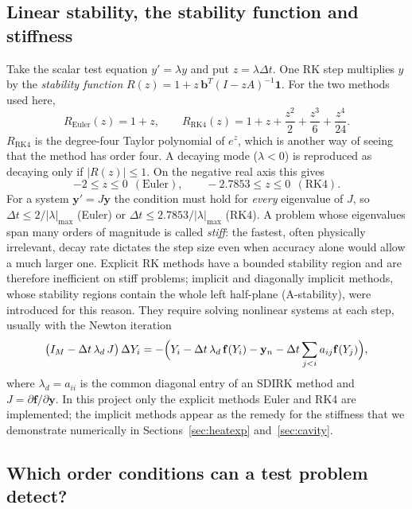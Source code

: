 \documentclass[11pt,a4paper]{article}
\newcommand{\Dt}{\Delta t}
\newcommand{\bfy}{\mathbf{y}}
\newcommand{\bff}{\mathbf{f}}
\begin{document}
\subsection{Linear stability, the stability function and stiffness}\label{sec:stab}

Take the scalar test equation $y'=\lambda y$ and put $z=\lambda\Dt$. One RK step multiplies $y$ by the
\emph{stability function} $R(z)=1+z\,\mathbf b^{T}(I-zA)^{-1}\mathbf 1$. For the two methods used here,
\begin{equation}
R_{\mathrm{Euler}}(z)=1+z,\qquad
R_{\mathrm{RK4}}(z)=1+z+\frac{z^2}{2}+\frac{z^3}{6}+\frac{z^4}{24}.
\end{equation}
$R_{\mathrm{RK4}}$ is the degree-four Taylor polynomial of $e^z$, which is another way of seeing that the
method has order four. A decaying mode ($\lambda<0$) is reproduced as decaying only if $|R(z)|\le1$.
On the negative real axis this gives
\begin{equation}
-2\le z\le0\ \ (\text{Euler}),\qquad -2.7853\le z\le0\ \ (\text{RK4}).
\label{eq:stablimits}
\end{equation}
For a system $\bfy'=J\bfy$ the condition must hold for \emph{every} eigenvalue of $J$, so
$\Dt\le 2/|\lambda|_{\max}$ (Euler) or $\Dt\le 2.7853/|\lambda|_{\max}$ (RK4). A problem whose
eigenvalues span many orders of magnitude is called \emph{stiff}: the fastest, often physically
irrelevant, decay rate dictates the step size even when accuracy alone would allow a much larger one.
Explicit RK methods have a bounded stability region and are therefore inefficient on stiff problems;
implicit and diagonally implicit methods, whose stability regions contain the whole left half-plane
(A-stability), were introduced for this reason. They require solving nonlinear systems at each step,
usually with the Newton iteration
\begin{equation}
\bigl(I_M-\Dt\,\lambda_{d}\,J\bigr)\,\Delta Y_i=-\Bigl(Y_i-\Dt\,\lambda_d\,\bff(Y_i)-\bfy_n-\Dt\sum_{j<i}a_{ij}\bff(Y_j)\Bigr),
\end{equation}
where $\lambda_d=a_{ii}$ is the common diagonal entry of an SDIRK method and $J=\partial\bff/\partial\bfy$.
In this project only the explicit methods Euler and RK4 are implemented; the implicit methods appear
as the remedy for the stiffness that we demonstrate numerically in Sections~\ref{sec:heatexp}
and~\ref{sec:cavity}.


\subsection{Which order conditions can a test problem detect?}\label{sec:detect}
\end{document}
